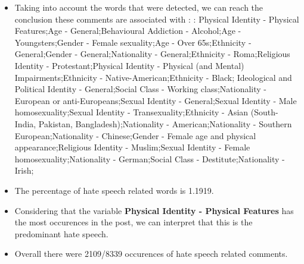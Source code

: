 \documentclass[11pt]{article}
\begin{document}
\begin{itemize}\item Taking into account the words that were detected, we can reach the conclusion these comments are associated with : : Physical Identity - Physical Features;Age - General;Behavioural Addiction - Alcohol;Age - Youngsters;Gender - Female sexuality;Age - Over 65s;Ethnicity - General;Gender - General;Nationality - General;Ethnicity - Roma;Religious Identity - Protestant;Physical Identity - Physical (and Mental) Impairments;Ethnicity - Native-American;Ethnicity - Black; Ideological and Political Identity - General;Social Class - Working class;Nationality - European or anti-Europeans;Sexual Identity - General;Sexual Identity - Male homosexuality;Sexual Identity - Transexuality;Ethnicity - Asian (South- India, Pakistan, Bangladesh);Nationality - American;Nationality - Southern European;Nationality - Chinese;Gender - Female age and physical appearance;Religious Identity - Muslim;Sexual Identity - Female homosexuality;Nationality - German;Social Class - Destitute;Nationality - Irish;%

\item The percentage of hate speech related words is 1.1919.

\item Considering that the variable \textbf{Physical Identity - Physical Features} has the most occurences in the post, we can interpret that this is the predominant hate speech.

\item Overall there were 2109/8339 occurences of hate speech related comments.\end{itemize}
\end{document}
